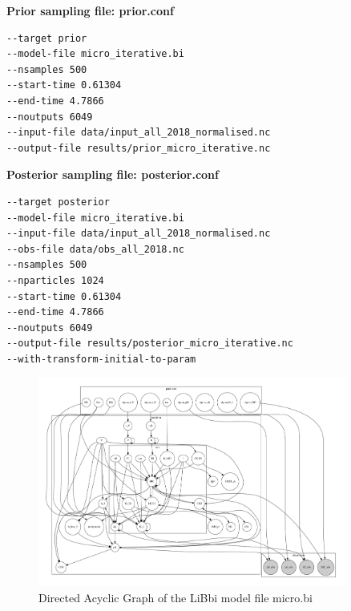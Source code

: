 \documentclass{ruthesis}
\begin{document}
\textbf{Prior sampling file: prior.conf}
\begin{verbatim}
--target prior
--model-file micro_iterative.bi
--nsamples 500
--start-time 0.61304
--end-time 4.7866
--noutputs 6049
--input-file data/input_all_2018_normalised.nc
--output-file results/prior_micro_iterative.nc
\end{verbatim}

\textbf{Posterior sampling file: posterior.conf}
\begin{verbatim}
--target posterior
--model-file micro_iterative.bi
--input-file data/input_all_2018_normalised.nc
--obs-file data/obs_all_2018.nc
--nsamples 500
--nparticles 1024
--start-time 0.61304
--end-time 4.7866
--noutputs 6049
--output-file results/posterior_micro_iterative.nc
--with-transform-initial-to-param
\end{verbatim}

\begin{figure}
	\centerline{\includegraphics[width=0.9\textwidth]{images_microalgae/micro_template.pdf}}
	\caption[.]{Directed Acyclic Graph of the LiBbi model file micro.bi}
	\label{fig:micro_DAG}
\end{figure}


{}


%
%
\end{document}
